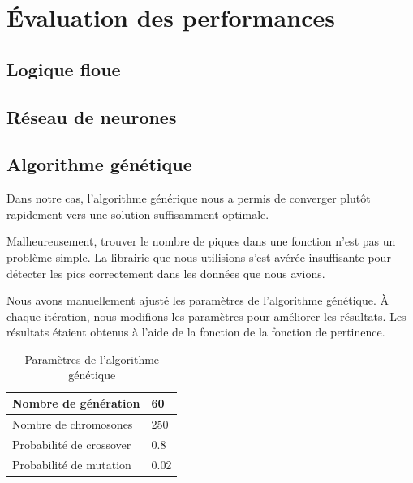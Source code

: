 \documentclass[12pt,letterpaper]{article}
\begin{document}
\section{Évaluation des performances}

\subsection{Logique floue}

\subsection{Réseau de neurones} %

\subsection{Algorithme génétique}

Dans notre cas, l'algorithme générique nous a permis de converger plutôt rapidement vers une solution suffisamment optimale. 

Malheureusement, trouver le nombre de piques dans une fonction n'est pas un problème simple. La librairie que nous utilisions 
s'est avérée insuffisante pour détecter les pics correctement dans les données que nous avions. 

Nous avons manuellement ajusté les paramètres de l'algorithme génétique. À chaque itération, nous modifions les paramètres pour 
améliorer les résultats. Les résultats étaient obtenus à l'aide de la fonction de la fonction de pertinence. 

\begin{table}[h]
  \begin{center}
    \begin{tabular} {|l|l|}
        \hline
        Nombre de génération & 60 \\
        \hline
        Nombre de chromosones & 250 \\
        \hline
        Probabilité de crossover & 0.8 \\
        \hline
        Probabilité de mutation & 0.02 \\
        \hline
    \end{tabular}
    \caption{Paramètres de l'algorithme génétique}
  \end{center}
\end{table}
\end{document}
